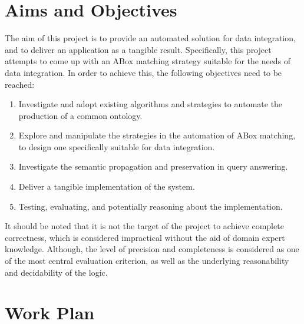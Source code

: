 \documentclass[a4paper,12pt,twoside]{article}
\begin{document}
\section{Aims and Objectives}


The aim of this project is to provide an automated solution for data integration, and to deliver an application as a tangible result. Specifically, this project attempts to come up with an ABox matching strategy suitable for the needs of data integration. In order to achieve this, the following objectives need to be reached:
\begin{enumerate}[itemsep=1.1em]
	\item Investigate and adopt existing algorithms and strategies to automate the production of a common ontology.
	\item Explore and manipulate the strategies in the automation of ABox matching, to design one specifically suitable for data integration.
	\item Investigate the semantic propagation and preservation in query answering.
	\item Deliver a tangible implementation of the system.
	\item Testing, evaluating, and potentially reasoning about the implementation.
\end{enumerate}
It should be noted that it is not the target of the project to achieve complete correctness, which is considered impractical without the aid of domain expert knowledge. Although, the level of precision and completeness is considered as one of the most central evaluation criterion, as well as the underlying reasonability and decidability of the logic.


\section{Work Plan}

\end{document}
